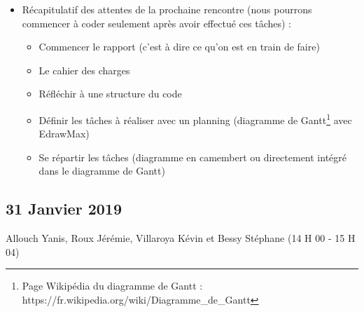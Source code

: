 \documentclass[11pt,a4paper]{article}
\begin{document}
\begin{itemize}[itemsep=5pt]
\item Récapitulatif des attentes de la prochaine rencontre (nous pourrons commencer à coder seulement après avoir effectué ces tâches) :

\begin{itemize} [label=$\Rightarrow$]
    \item Commencer le rapport (c'est à dire ce qu'on est en train de faire)
    \item Le cahier des charges
    \item Réfléchir à une structure du code
    \item Définir les tâches à réaliser avec un planning (diagramme de Gantt\footnote{Page Wikipédia du diagramme de Gantt : https://fr.wikipedia.org/wiki/Diagramme\_de\_Gantt} avec EdrawMax)
    \item Se répartir les tâches (diagramme en camembert ou directement intégré dans le diagramme de Gantt)
\end{itemize}
 
\end{itemize}

\newpage
\subsection{31 Janvier 2019}
Allouch Yanis, Roux Jérémie, Villaroya Kévin et Bessy Stéphane (14 H 00 - 15 H 04)\\
\end{document}

